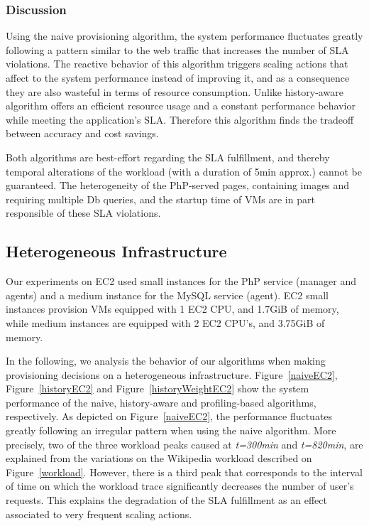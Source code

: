 \subsubsection{Discussion}

Using the naive provisioning algorithm, the system performance fluctuates greatly following a pattern similar to the web traffic that increases the number of SLA violations. The reactive behavior of this algorithm triggers scaling actions that affect to the system performance instead of improving it, and as a consequence they are also wasteful in terms of resource consumption. Unlike history-aware algorithm offers an efficient resource usage and a constant performance behavior while meeting the application's SLA. Therefore this algorithm finds the tradeoff between accuracy and cost savings.

Both algorithms are best-effort regarding the SLA fulfillment, and thereby temporal alterations of the workload (with a duration of 5min approx.) cannot be guaranteed. The heterogeneity of the PhP-served pages, containing images and requiring multiple Db queries, and the startup time of VMs are in part responsible of these SLA violations. 




\subsection{Heterogeneous Infrastructure}

Our experiments on EC2 used small instances for the PhP service (manager and agents) and  a medium instance for the MySQL service (agent). EC2 small instances provision VMs equipped with 1 EC2 CPU, and 1.7GiB of memory, while medium instances are equipped with 2 EC2 CPU's, and 3.75GiB of memory.

In the following, we analysis the behavior of our algorithms when making provisioning decisions on a heterogeneous infrastructure. Figure~\ref{naiveEC2}, Figure~\ref{historyEC2} and Figure~\ref{historyWeightEC2} show the system performance of the naive, history-aware and profiling-based algorithms, respectively. As depicted on Figure~\ref{naiveEC2}, the performance fluctuates greatly following an irregular pattern when using the naive algorithm. More precisely, two of the three workload peaks caused at \emph{t=300min} and \emph{t=820min}, are explained from the variations on the Wikipedia workload described on Figure~\ref{workload}. However, there is a third peak that corresponds to the interval of time on which the workload trace significantly decreases the number of user's requests. This explains the degradation of the SLA fulfillment as an effect associated to very frequent scaling actions. 

